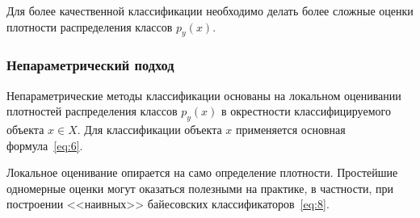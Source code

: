 Для более качественной классификации необходимо делать более сложные оценки плотности распределения
классов \( p_y(x) \).

\subsubsection{Непараметрический подход}
Непараметрические методы классификации основаны на локальном оценивании плотностей распределения
классов \( p_y(x) \) в окрестности классифицируемого объекта \( x\in X \). Для классификации объекта
\( x \) применяется основная формула~\eqref{eq:6}.

Локальное оценивание опирается на само определение плотности. Простейшие одномерные оценки могут
оказаться полезными на практике, в частности, при построении <<наивных>> байесовских
классификаторов~\eqref{eq:8}.

